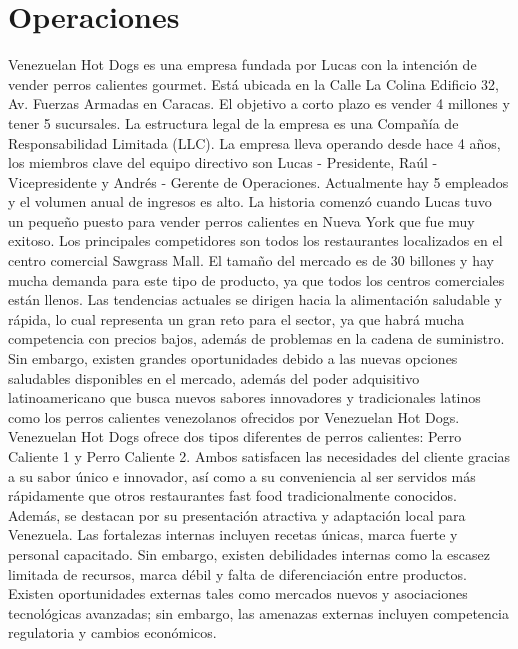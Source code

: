 \section{Operaciones} \label{sec:operaciones}Venezuelan Hot Dogs es una empresa fundada por Lucas con la intención de vender perros calientes gourmet. Está ubicada en la Calle La Colina Edificio 32, Av. Fuerzas Armadas en Caracas. El objetivo a corto plazo es vender 4 millones y tener 5 sucursales. La estructura legal de la empresa es una Compañía de Responsabilidad Limitada (LLC). La empresa lleva operando desde hace 4 años, los miembros clave del equipo directivo son Lucas - Presidente, Raúl - Vicepresidente y Andrés - Gerente de Operaciones. Actualmente hay 5 empleados y el volumen anual de ingresos es alto.
La historia comenzó cuando Lucas tuvo un pequeño puesto para vender perros calientes en Nueva York que fue muy exitoso. Los principales competidores son todos los restaurantes localizados en el centro comercial Sawgrass Mall. El tamaño del mercado es de 30 billones y hay mucha demanda para este tipo de producto, ya que todos los centros comerciales están llenos. Las tendencias actuales se dirigen hacia la alimentación saludable y rápida, lo cual representa un gran reto para el sector, ya que habrá mucha competencia con precios bajos, además de problemas en la cadena de suministro. Sin embargo, existen grandes oportunidades debido a las nuevas opciones saludables disponibles en el mercado, además del poder adquisitivo latinoamericano que busca nuevos sabores innovadores y tradicionales latinos como los perros calientes venezolanos ofrecidos por Venezuelan Hot Dogs.
Venezuelan Hot Dogs ofrece dos tipos diferentes de perros calientes: Perro Caliente 1 y Perro Caliente 2. Ambos satisfacen las necesidades del cliente gracias a su sabor único e innovador, así como a su conveniencia al ser servidos más rápidamente que otros restaurantes fast food tradicionalmente conocidos. Además, se destacan por su presentación atractiva y adaptación local para Venezuela. Las fortalezas internas incluyen recetas únicas, marca fuerte y personal capacitado. Sin embargo, existen debilidades internas como la escasez limitada de recursos, marca débil y falta de diferenciación entre productos. Existen oportunidades externas tales como mercados nuevos y asociaciones tecnológicas avanzadas; sin embargo, las amenazas externas incluyen competencia regulatoria y cambios económicos.
